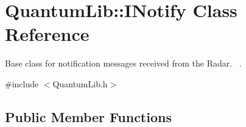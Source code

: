 \hypertarget{class_quantum_lib_1_1_i_notify}{}\section{Quantum\+Lib\+:\+:I\+Notify Class Reference}
\label{class_quantum_lib_1_1_i_notify}


Base class for notification messages received from the Radar.~\newline
.  




{\ttfamily \#include $<$Quantum\+Lib.\+h$>$}

\subsection*{Public Member Functions}

